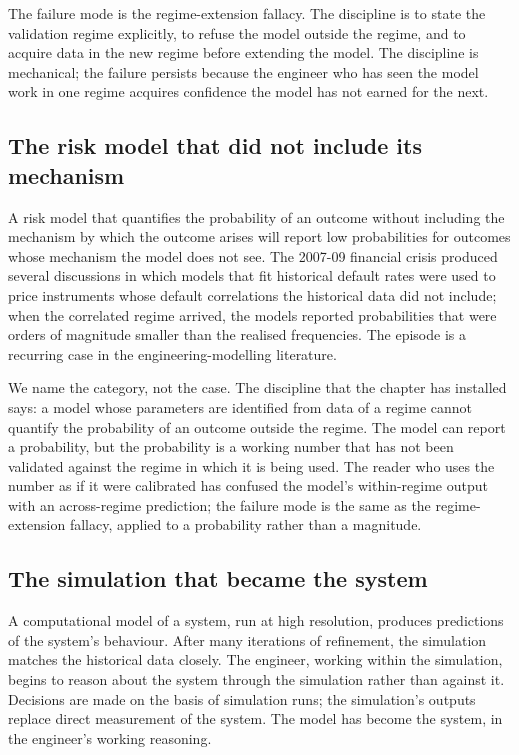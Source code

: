 The failure mode is the regime-extension fallacy. The
discipline is to state the validation regime explicitly, to
refuse the model outside the regime, and to acquire data in
the new regime before extending the model. The discipline is
mechanical; the failure persists because the engineer who has
seen the model work in one regime acquires confidence the
model has not earned for the next.

\subsection{The risk model that did not include its mechanism}

A risk model that quantifies the probability of an outcome
without including the mechanism by which the outcome arises
will report low probabilities for outcomes whose mechanism the
model does not see. The 2007-09 financial crisis produced
several discussions in which models that fit historical
default rates were used to price instruments whose default
correlations the historical data did not include; when the
correlated regime arrived, the models reported probabilities
that were orders of magnitude smaller than the realised
frequencies. The episode is a recurring case in the
engineering-modelling literature.

We name the category, not the case. The discipline that the
chapter has installed says: a model whose parameters are
identified from data of a regime cannot quantify the
probability of an outcome outside the regime. The model can
report a probability, but the probability is a working
number that has not been validated against the regime in
which it is being used. The reader who uses the number as if
it were calibrated has confused the model's within-regime
output with an across-regime prediction; the failure mode is
the same as the regime-extension fallacy, applied to a
probability rather than a magnitude.

\subsection{The simulation that became the system}

A computational model of a system, run at high resolution,
produces predictions of the system's behaviour. After many
iterations of refinement, the simulation matches the
historical data closely. The engineer, working within the
simulation, begins to reason about the system through the
simulation rather than against it. Decisions are made on the
basis of simulation runs; the simulation's outputs replace
direct measurement of the system. The model has become the
system, in the engineer's working reasoning.

